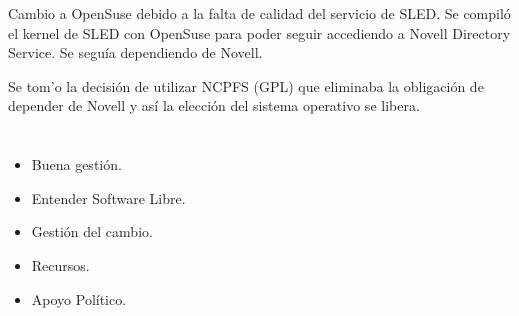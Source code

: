 \documentclass[11pt]{scrartcl}
\begin{document}
\par Cambio a OpenSuse debido a la falta de calidad del servicio de SLED. Se compil\'o el kernel de SLED con OpenSuse para poder seguir accediendo a Novell Directory Service. Se segu\'ia dependiendo de Novell.

\par Se tom'o la decisi\'on de utilizar NCPFS (GPL) que eliminaba la obligaci\'on de depender de Novell y as\'i la elecci\'on del sistema operativo se libera.


\section{}
\label{sec:exito}

\begin{itemize}
	\item Buena gesti\'on.
	\item Entender Software Libre.
	\item Gesti\'on del cambio.
	\item Recursos.
	\item Apoyo Pol\'itico.
\end{itemize}

\end{document}
